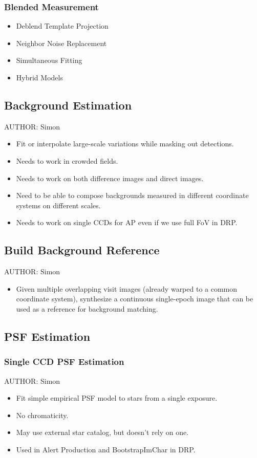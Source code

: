 \subsubsection{Blended Measurement}
\begin{itemize}
\item Deblend Template Projection
\item Neighbor Noise Replacement
\item Simultaneous Fitting
\item Hybrid Models
\end{itemize}

\subsection{Background Estimation}
AUTHOR: Simon
\begin{itemize}
\item Fit or interpolate large-scale variations while masking out detections.
\item Needs to work in crowded fields.
\item Needs to work on both difference images and direct images.
\item Need to be able to compose backgrounds measured in different coordinate systems on different scales.
\item Needs to work on single CCDs for AP even if we use full FoV in DRP.
\end{itemize}

\subsection{Build Background Reference}
AUTHOR: Simon
\begin{itemize}
\item Given multiple overlapping visit images (already warped to a common coordinate system), synthesize a continuous single-epoch image that can be used as a reference for background matching.
\end{itemize}

\subsection{PSF Estimation}

\subsubsection{Single CCD PSF Estimation}
AUTHOR: Simon
\begin{itemize}
\item Fit simple empirical PSF model to stars from a single exposure.
\item No chromaticity.
\item May use external star catalog, but doesn't rely on one.
\item Used in Alert Production and BootstrapImChar in DRP.
\end{itemize}


